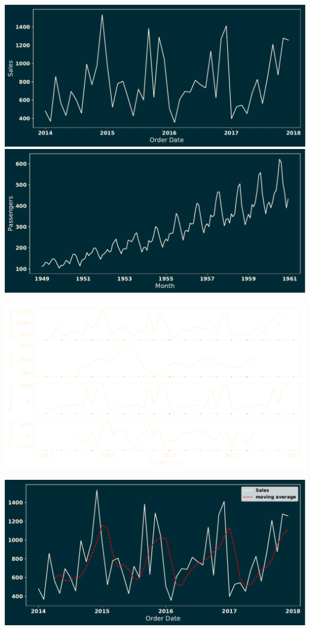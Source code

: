 \documentclass{beamer}
\begin{document}
\begin{frame}
    \begin{center}
    \includegraphics[width=.7\textwidth]{static/sales.pdf}
    \includegraphics[width=.7\textwidth]{static/airline_passengers.pdf}
    \end{center}
\end{frame}

\begin{frame}
    \begin{center}
    \includegraphics[width=\textwidth]{static/decomposition.pdf}
    \end{center}
\end{frame}

\begin{frame}
    \begin{center}
    \includegraphics[width=\textwidth]{static/moving_average.pdf}
    \end{center}
\end{frame}
\end{document}
